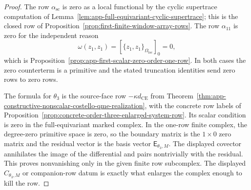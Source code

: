 \begin{proof}
  The row \(\alpha_{\mathrm{sc}}\) is zero as a local functional by the
  cyclic supertrace computation of
  Lemma~\ref{lem:app-full-equivariant-cyclic-supertrace}; this is the
  closed row of Proposition~\ref{prop:first-finite-window-array-rows}.
  The row \(\alpha_{11}\) is zero for the independent reason
  \[
    \omega(z_1,z_1)=
    [\{z_1,z_1\}_{\Omega_{\mathrm{loc}}}]_0=0,
  \]
  which is Proposition~\ref{prop:app-first-scalar-zero-order-one-row}.
  In both cases the zero counterterm is a primitive and the stated
  truncation identities send zero rows to zero rows.

  The formula for \(\theta_3\) is the source-face row
  \(-\kappa d_{\mathrm{CE}}\) from
  Theorem~\ref{thm:app-constructive-nonscalar-costello-qme-realization},
  with the concrete row labels of
  Proposition~\ref{prop:concrete-order-three-enlarged-system-row}.  Its
  scalar condition is zero in the full-equivariant marked complex.  In the
  one-row finite complex, the degree-zero primitive space is zero,
  so the boundary matrix is the \(1\times0\) zero matrix and the residual
  vector is the basis vector \(\mathsf E_{\theta_3,M}\).  The displayed
  covector annihilates the image of the differential and pairs
  nontrivially with the residual.
  This proves nonvanishing only in the given finite row subcomplex.
  The displayed \(C_{\theta_3,M}\) or companion-row datum is exactly what
  enlarges the complex enough to kill the row.
\end{proof}

